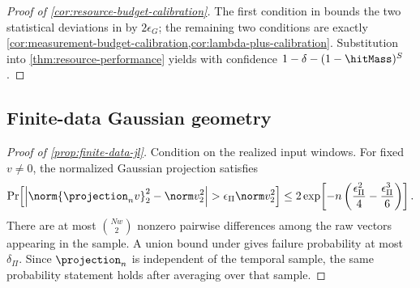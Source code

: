 \begin{proof}[Proof of \cref{cor:resource-budget-calibration}]
The first condition in  bounds the two statistical deviations in
 by $2\epsilon_G$; the remaining two
conditions are exactly
\cref{cor:measurement-budget-calibration,cor:lambda-plus-calibration}.
Substitution into \cref{thm:resource-performance} yields
 with confidence
$1-\delta-(1-\hitMass)^S$.
\end{proof}

\subsection{Finite-data Gaussian geometry}

\begin{proof}[Proof of \cref{prop:finite-data-jl}]
Condition on the realized input windows.  For fixed $v\neq0$, the normalized
Gaussian projection satisfies
\[
\Pr\!\left[
  \left|\norm{\projection_nv}_2^2-\norm v_2^2\right|
  >\epsilon_\Pi\norm v_2^2
\right]
\leq
2\exp\!\left[-n\left(\frac{\epsilon_\Pi^2}{4}
-\frac{\epsilon_\Pi^3}{6}\right)\right].
\]
There are at most $\binom{Nw}{2}$ nonzero pairwise differences among the raw
vectors appearing in the sample.  A union bound under
 gives failure probability at most
$\delta_\Pi$.  Since $\projection_n$ is independent of the temporal sample,
the same probability statement holds after averaging over that sample.
\end{proof}
